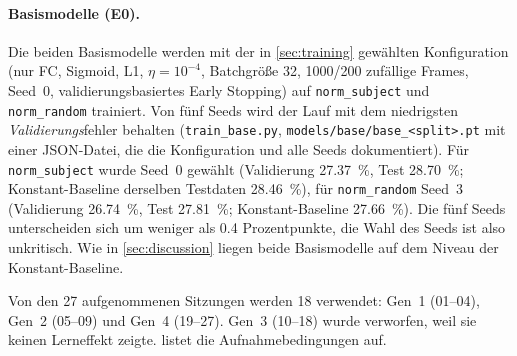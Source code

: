 \documentclass[
  11pt,
  a4paper,
  oneside,
  DIV=12,
  BCOR=8mm,
  parskip=half,
  headings=normal,
  bibliography=totoc,
  listof=totoc
]{scrreprt}
\newcommand{\code}[1]{\texttt{#1}}
\begin{document}
\paragraph{Basismodelle (E0).} Die beiden Basismodelle werden mit der in
\cref{sec:training} gewählten Konfiguration (nur FC, Sigmoid, L1,
$\eta=10^{-4}$, Batchgröße 32, \num{1000}/\num{200} zufällige Frames, Seed~0,
validierungsbasiertes Early Stopping) auf \code{norm\_subject} und
\code{norm\_random} trainiert. Von fünf Seeds wird der Lauf mit dem
niedrigsten \emph{Validierungs}fehler behalten (\code{train\_base.py},
\code{models/base/base\_<split>.pt} mit einer JSON-Datei, die die
Konfiguration und alle Seeds dokumentiert). Für \code{norm\_subject} wurde
Seed~0 gewählt (Validierung \SI{27,37}{\percent}, Test \SI{28,70}{\percent};
Konstant-Baseline derselben Testdaten \SI{28,46}{\percent}), für
\code{norm\_random} Seed~3 (Validierung \SI{26,74}{\percent}, Test
\SI{27,81}{\percent}; Konstant-Baseline \SI{27,66}{\percent}). Die fünf Seeds
unterscheiden sich um weniger als \num{0,4} Prozentpunkte, die Wahl des Seeds
ist also unkritisch. Wie in \cref{sec:discussion} liegen beide Basismodelle
auf dem Niveau der Konstant-Baseline.

Von den 27 aufgenommenen Sitzungen werden 18 verwendet: Gen~1 (01--04), Gen~2
(05--09) und Gen~4 (19--27). Gen~3 (10--18) wurde verworfen, weil sie keinen
Lerneffekt zeigte.  listet die
Aufnahmebedingungen auf.
\end{document}
